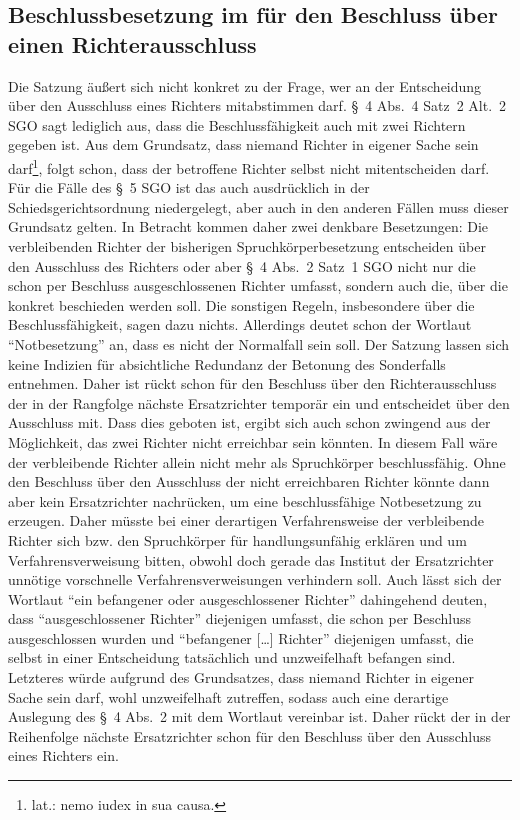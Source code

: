 \subsection{Beschlussbesetzung im für den Beschluss über einen Richterausschluss}
\label{Zusammensetzung:Spruchkoerper:Besetzungausschlussbeschluss}
Die Satzung äußert sich nicht konkret zu der Frage, wer an der Entscheidung über den Ausschluss eines Richters mitabstimmen darf.
\S~4 Abs.~4 Satz~2 Alt.~2 SGO sagt lediglich aus, dass die Beschlussfähigkeit auch mit zwei Richtern gegeben ist.
Aus dem Grundsatz, dass niemand Richter in eigener Sache sein darf\footnote{lat.: nemo iudex in sua causa.}, folgt schon, dass der betroffene Richter selbst nicht mitentscheiden darf. Für die Fälle des \S~5 SGO ist das auch ausdrücklich in der Schiedsgerichtsordnung niedergelegt, aber auch in den anderen Fällen muss dieser Grundsatz gelten.
In Betracht kommen daher zwei denkbare Besetzungen: Die verbleibenden Richter der bisherigen Spruchkörperbesetzung entscheiden über den Ausschluss des Richters oder aber \S~4 Abs.~2 Satz~1 SGO nicht nur die schon per Beschluss ausgeschlossenen Richter umfasst, sondern auch die, über die konkret beschieden werden soll.
Die sonstigen Regeln, insbesondere über die Beschlussfähigkeit, sagen dazu nichts.
Allerdings deutet schon der Wortlaut \enquote{Notbesetzung} an, dass es nicht der Normalfall sein soll.
Der Satzung lassen sich keine Indizien für absichtliche Redundanz der Betonung des Sonderfalls entnehmen.
Daher ist rückt schon für den Beschluss über den Richterausschluss der in der Rangfolge nächste Ersatzrichter temporär ein und entscheidet über den Ausschluss mit.
Dass dies geboten ist, ergibt sich auch schon zwingend aus der Möglichkeit, das zwei Richter nicht erreichbar sein könnten.
In diesem Fall wäre der verbleibende Richter allein nicht mehr als Spruchkörper beschlussfähig.
Ohne den Beschluss über den Ausschluss der nicht erreichbaren Richter könnte dann aber kein Ersatzrichter nachrücken, um eine beschlussfähige Notbesetzung zu erzeugen.
Daher müsste bei einer derartigen Verfahrensweise der verbleibende Richter sich bzw. den Spruchkörper für handlungsunfähig erklären und um Verfahrensverweisung bitten, obwohl doch gerade das Institut der Ersatzrichter unnötige vorschnelle Verfahrensverweisungen verhindern soll.
Auch lässt sich der Wortlaut \enquote{ein befangener oder ausgeschlossener Richter} dahingehend deuten, dass \enquote{ausgeschlossener Richter} diejenigen umfasst, die schon per Beschluss ausgeschlossen wurden und \enquote{befangener […] Richter} diejenigen umfasst, die selbst in einer Entscheidung tatsächlich und unzweifelhaft befangen sind. Letzteres würde aufgrund des Grundsatzes, dass niemand Richter in eigener Sache sein darf, wohl unzweifelhaft zutreffen, sodass auch eine derartige Auslegung des \S~4 Abs.~2 mit dem Wortlaut vereinbar ist.
Daher rückt der in der Reihenfolge nächste Ersatzrichter schon für den Beschluss über den Ausschluss eines Richters ein.

